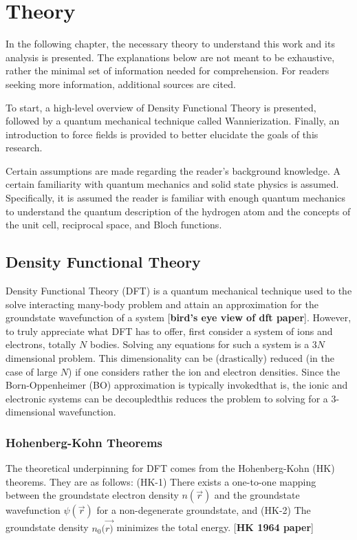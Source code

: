 \chapter{Theory}

In the following chapter, the necessary theory to understand this work and its analysis is presented. The explanations below are not meant to be exhaustive, rather the minimal set of information needed for comprehension. For readers seeking more information, additional sources are cited.

To start, a high-level overview of Density Functional Theory is presented, followed by a quantum mechanical technique called Wannierization. Finally, an introduction to force fields is provided to better elucidate the goals of this research.

Certain assumptions are made regarding the reader's background knowledge. A certain familiarity with quantum mechanics and solid state physics is assumed. Specifically, it is assumed the reader is familiar with enough quantum mechanics to understand the quantum description of the hydrogen atom and the concepts of the unit cell, reciprocal space, and Bloch functions. 

\section{Density Functional Theory}

Density Functional Theory (DFT) is a quantum mechanical technique used to the solve interacting many-body problem and attain an approximation for the groundstate wavefunction of a system [\textbf{bird's eye view of dft paper}]. However, to truly appreciate what DFT has to offer, first consider a system of ions and electrons, totally $N$ bodies. Solving any equations for such a system is a $3N$ dimensional problem. This dimensionality can be (drastically) reduced (in the case of large $N$) if one considers rather the ion and electron densities. Since the Born-Oppenheimer (BO) approximation is typically invoked\textemdash that is, the ionic and electronic systems can be decoupled\textemdash this reduces the problem to solving for a 3-dimensional wavefunction.

    \subsection{Hohenberg-Kohn Theorems} 
    
    The theoretical underpinning for DFT comes from the Hohenberg-Kohn (HK) theorems. They are as follows: (HK-1) There exists a one-to-one mapping between the groundstate electron density $n(\Vec{r})$ and the groundstate wavefunction $\psi (\Vec{r})$ for a non-degenerate groundstate, and (HK-2) The groundstate density $n_0(\Vec{r)}$ minimizes the total energy. [\textbf{HK 1964 paper}]
    
